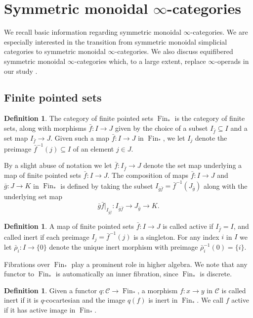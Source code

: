 \documentclass[reqno]{amsart}
\theoremstyle{definition}
\newtheorem{definition}[lemma]{Definition}
\newcommand{\msc}[1]{\mathscr{#1}}
\newcommand{\opn}[1]{\operatorname{#1}}
\DeclareMathOperator{\Fin}{Fin}
\renewcommand{\1}{\mathbf{1}}
\begin{document}
\section{Symmetric monoidal $\infty$-categories}
\label{sect:monoidal_infty}

We recall basic information regarding symmetric monoidal $\infty$-categories. We are especially interested in the transition from symmetric monoidal simplicial categories to symmetric monoidal $\infty$-categories. We also discuss equifibered symmetric monoidal $\infty$-categories which, to a large extent, replace $\infty$-operads in our study \cite{haugsengkock24,barkanetal25}.

\subsection{Finite pointed sets}

\begin{definition}
The category of finite pointed sets $\opn{Fin}_\ast$ is the category of finite sets, along with morphisms $\bar{f}:I\to J$ given by the choice of a subset $I_{\bar{f}}\subseteq I$ and a set map $I_{\bar{f}}\to J$.  Given such a map $\bar{f}:I\to J$ in $\Fin_{\ast}$, we let $I_{j}$ denote the preimage $\bar{f}^{-1}(j)\subseteq I$ of an element $j\in J$.
\end{definition}

By a slight abuse of notation we let $\bar{f}:I_{\bar{f}}\to J$ denote the set map underlying a map of finite pointed sets $\bar{f}:I\to J$.  The composition of maps $\bar{f}:I\to J$ and $\bar{g}:J\to K$ in $\Fin_{\ast}$ is defined by taking the subset $I_{\bar{g}\bar{f}}=\bar{f}^{-1}(J_{\bar{g}})$ along with the underlying set map
\[
\bar{g}\bar{f}|_{I_{\bar{g}\bar{f}}}:I_{\bar{g}\bar{f}}\to J_{\bar{g}}\to K.
\]

\begin{definition}
A map of finite pointed sets $\bar{f}:I\to J$ is called active if $I_{\bar{f}}=I$, and called inert if each preimage $I_j=\bar{f}^{-1}(j)$ is a singleton. For any index $i$ in $I$ we let $\bar{\rho}_i:I\to \{0\}$ denote the unique inert morphism with preimage $\bar{\rho}_i^{-1}(0)=\{i\}$.
\end{definition}

Fibrations over $\Fin_{\ast}$ play a prominent role in higher algebra. We note that any functor to $\Fin_{\ast}$ is automatically an inner fibration, since $\Fin_{\ast}$ is discrete.

\begin{definition}
Given a functor $q:\msc{C}\to \Fin_{\ast}$, a morphism $f:x\to y$ in $\msc{C}$ is called inert if it is $q$-cocartesian and the image $q(f)$ is inert in $\Fin_{\ast}$. We call $f$ active if it has active image in $\Fin_{\ast}$.
\end{definition}
\end{document}
